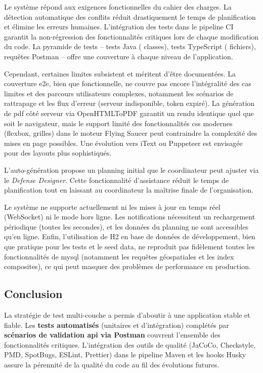 Le système répond aux exigences fonctionnelles du cahier des charges. La détection automatique des conflits réduit drastiquement le temps de planification et élimine les erreurs humaines. L'intégration des tests dans le pipeline CI garantit la non-régression des fonctionnalités critiques lors de chaque modification du code. La pyramide de tests --  tests Java ( classes),  tests TypeScript ( fichiers),  requêtes Postman -- offre une couverture à chaque niveau de l'application.

Cependant, certaines limites subsistent et méritent d'être documentées. La couverture \acrshort{e2e}, bien que fonctionnelle, ne couvre pas encore l'intégralité des cas limites et des parcours utilisateurs complexes, notamment les scénarios de rattrapage et les flux d'erreur (serveur indisponible, token expiré). La génération de \acrshort{pdf} côté serveur via OpenHTMLToPDF garantit un rendu identique quel que soit le navigateur, mais le support limité des fonctionnalités \acrshort{css} modernes (flexbox, grilles) dans le moteur Flying Saucer peut contraindre la complexité des mises en page possibles. Une évolution vers iText ou Puppeteer est envisagée pour des layouts plus sophistiqués.

L'auto-génération propose un planning initial que le coordinateur peut ajuster via le \textit{Defense Designer}. Cette fonctionnalité d'assistance réduit le temps de planification tout en laissant au coordinateur la maîtrise finale de l'organisation.

Le système ne supporte actuellement ni les mises à jour en temps réel (WebSocket) ni le mode hors ligne. Les notifications nécessitent un rechargement périodique (toutes les  secondes), et les données du planning ne sont accessibles qu'en ligne. Enfin, l'utilisation de H2 en base de données de développement, bien que pratique pour les tests et le seed data, ne reproduit pas fidèlement toutes les fonctionnalités de \acrshort{mysql} (notamment les requêtes géospatiales et les index composites), ce qui peut masquer des problèmes de performance en production.

\subsection{Conclusion}
\label{ch5:conclusion}

La stratégie de test multi-couche a permis d'aboutir à une application stable et fiable. Les \textbf{ tests automatisés} (unitaires et d'intégration) complétés par \textbf{ scénarios de validation \acrshort{api} via Postman} couvrent l'ensemble des fonctionnalités critiques. L'intégration des outils de qualité (JaCoCo, Checkstyle, PMD, SpotBugs, ESLint, Prettier) dans le pipeline Maven et les hooks Husky assure la pérennité de la qualité du code au fil des évolutions futures.
